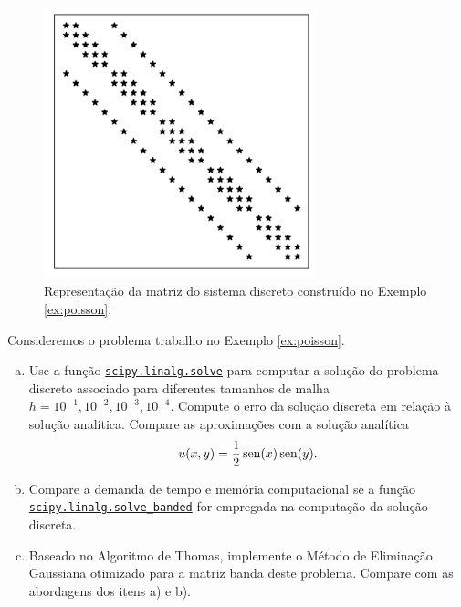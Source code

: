 \begin{ex}
  \begin{figure}[H]
    \centering
    \includegraphics[width=0.7\textwidth]{./cap_sislin/dados/figExPoissonMatriz/fig}
    \caption{Representação da matriz do sistema discreto construído no Exemplo \ref{ex:poisson}.}
    \label{fig:exPoissonMatriz}
  \end{figure}
\end{ex}

\begin{exer}
    Consideremos o problema trabalho no Exemplo \ref{ex:poisson}.
    \begin{enumerate}[a)]
    \item Use a função \href{https://docs.scipy.org/doc/scipy/reference/generated/scipy.linalg.solve.html}{\lstinline+scipy.linalg.solve+} para computar a solução do problema discreto associado para diferentes tamanhos de malha $h = 10^{-1}, 10^{-2}, 10^{-3}, 10^{-4}$. Compute o erro da solução discreta em relação à solução analítica. Compare as aproximações com a solução analítica
      \begin{equation}
        u(x,y) = \frac{1}{2}\operatorname{sen}(x)\operatorname{sen}(y).
      \end{equation}
    \item Compare a demanda de tempo e memória computacional se a função \href{https://docs.scipy.org/doc/scipy/reference/generated/scipy.linalg.solve_banded.html}{\lstinline+scipy.linalg.solve_banded+} for empregada na computação da solução discreta.
    \item Baseado no Algoritmo de Thomas, implemente o Método de Eliminação Gaussiana otimizado para a matriz banda deste problema. Compare com as abordagens dos itens a) e b).
    \end{enumerate}
\end{exer}

